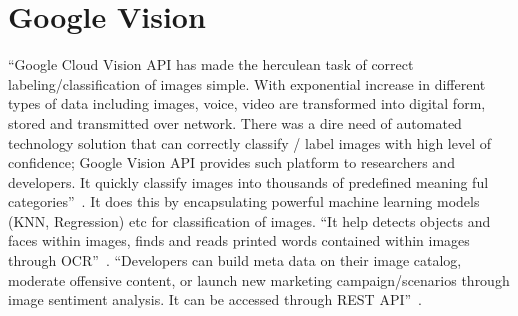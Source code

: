 \section{Google Vision}

``Google Cloud Vision API has made the herculean task of correct 
labeling/classification of images simple. With exponential increase 
in different types of data including images, voice, video are 
transformed into digital form, stored and transmitted over network. 
There was a dire need of automated technology solution that can 
correctly classify / label images with high level of confidence; 
Google Vision API provides such platform to researchers and developers. 
It quickly classify images into thousands of predefined 
meaning ful categories''~\cite{hid-sp18-523-www-google-vision}. 
It does this by encapsulating powerful machine learning 
models (KNN, Regression) etc for classification of images. 
``It help detects objects and faces within images, finds and reads 
printed words contained within images through 
OCR''~\cite{hid-sp18-523-www-google-vision}. 
``Developers can build meta data on their image catalog, moderate 
offensive content, or launch new marketing campaign/scenarios through 
image sentiment analysis. It can be accessed 
through REST API''~\cite{hid-sp18-523-www-google-vision}.

